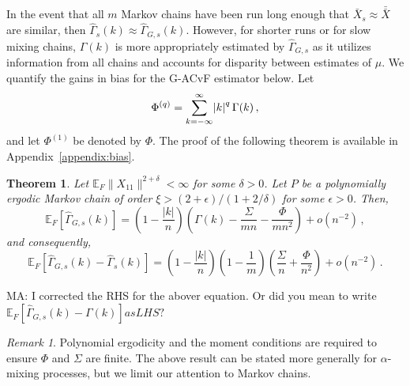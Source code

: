\documentclass[11pt]{article}
\newcommand{\E}{\mathbb{E}}
\newtheorem{theorem}{Theorem}
\theoremstyle{remark}
\newtheorem{remark}{Remark}
\begin{document}
In the event that all $m$ Markov chains have been run long enough that $\bar{X}_s \approx \bar{\bar{X}}$ are similar, then  $\hat{\Gamma}_{s} (k) \approx \hat{\Gamma}_{G,s}(k)$. However, for shorter runs or for slow mixing chains, $\Gamma(k)$ is more appropriately estimated by $\hat{\Gamma}_{G,s}$ as it utilizes information from all chains and accounts for disparity between estimates of $\mu$. We quantify the gains in  bias  for the G-ACvF estimator below.
Let 
\[
\Phi^{(q)} = \sum_{ k= -\infty}^{\infty}\abs{k}^q \Gamma(k)\,,
\]
and let $\Phi^{(1)}$ be denoted by $\Phi$.  The proof of the following theorem is available in Appendix~\ref{appendix:bias}.

\begin{theorem} \label{th:G-ACF_bias} Let $\E_F \|X_{11}\|^{2 + \delta} < \infty$ for some $\delta > 0$. Let $P$ be a  polynomially ergodic Markov chain of order $\xi > (2 + \epsilon)/(1 + 2/\delta)$ for some $\epsilon > 0$. Then,
\[
   \mathbb{E}_F\left[\hat{\Gamma}_{G,s}(k) \right] = \left(1- \dfrac{|k|}{n}\right) \left(\Gamma(k) - \dfrac{\Sigma}{mn} - \dfrac{\Phi}{mn^2}\right)  + o \left(n^{-2} \right)\,,
\]
and consequently,
\[
\mathbb{E}_F\left[\hat{\Gamma}_{G,s}(k) - \hat{\Gamma}_s(k) \right] =  \left(1- \dfrac{|k|}{n}\right)\left(1- \dfrac{1}{m}\right)\left(\dfrac{\Sigma}{n} + \dfrac{\Phi}{n^2}\right) + o\left(n^{-2} \right)\,. 
\]
\end{theorem}

{\color{orange}MA: I corrected the RHS for the abover equation. Or did you mean to write $\mathbb{E}_F\left[\hat{\Gamma}_{G,s}(k) - \Gamma(k) \right]as LHS?$} 

\begin{remark}
Polynomial ergodicity and the moment conditions are required to ensure $\Phi$ and $\Sigma$ are finite. The above result can be stated more generally for $\alpha$-mixing processes, but we limit our attention to Markov chains. 
\end{remark}
\end{document}
